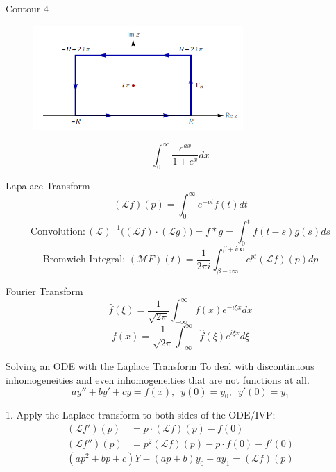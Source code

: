 \documentclass{beamer}
\begin{document}
\begin{frame}
\begin{block}{Contour 4}
\begin{figure}[h]
    \centering
    \includegraphics[width=8cm]{rectangle.png}
\end{figure}

$$\int_0^{\infty}\dfrac{e^{ax}}{1+e^x}dx$$
\end{block}
\end{frame}


\begin{frame}
\begin{block}{Lapalace Transform}
$$(\mathscr{L} f)(p)=\int_0^{\infty}e^{-pt}f(t)dt$$
$$\text{Convolution}: (\mathscr{L})^{-1}\Big((\mathscr{L}f)\cdot(\mathscr{L} g)\Big)=f*g=\int^t_0f (t-s)g(s) ds$$
$$\text{Bromwich Integral: }(\mathscr{M}F)(t) =\dfrac{1}{2\pi i}\int_{\beta-i\infty}^{\beta+i\infty}e^{pt}(\mathscr{L} f)(p) dp$$

\end{block}
\begin{block}{Fourier Transform}
$$\widehat{f}(\xi)=\dfrac{1}{\sqrt{2\pi}}\int_{-\infty}^{\infty}f(x)e^{-i\xi x}dx$$
$$f(x)=\dfrac{1}{\sqrt{2\pi}}\int_{-\infty}^{\infty}\widehat{f}(\xi)e^{i\xi x}d\xi$$
\end{block}
\end{frame}


\begin{frame}
\begin{block}{Solving an ODE with the Laplace Transform}
To deal with discontinuous inhomogeneities and even inhomogeneities that are not functions at all.
$$ay''+by'+cy=f(x),\,\,\,y(0)=y_0,\,\,\,y'(0)=y_1$$
\end{block}
\begin{block}{1.}
Apply the Laplace transform to both sides of the ODE/IVP;
\begin{align*}
(\mathscr{L}f')(p)&=p\cdot(\mathscr{L}f)(p)-f(0)\\
(\mathscr{L}f'')(p)&=p^2(\mathscr{L}f)(p)-p\cdot f(0)-f'(0)
\end{align*}
$$(ap^2+bp+c)Y-(ap+b)y_0-ay_1=(\mathscr{L}f)(p)$$
\end{block}
\end{frame}
\end{document}

